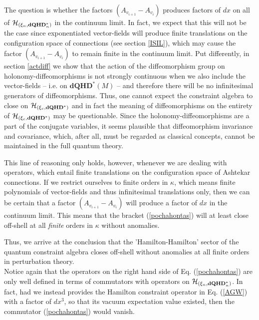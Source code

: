 \documentclass[12pt]{article}
\def\ch{{\cal H}}
\begin{document}
The question is whether the factors $(A_{v_{i+1}}-A_{v_i})$ produces factors of $dx$ on all of $\ch_{(\xi_n,\mathbf{dQHD}^*_n)}$ in the continuum limit. In fact, we expect that this will not be the case since exponentiated vector-fields will produce finite translations on the configuration space of connections (see section \ref{ISIL}), which may cause the factor $(A_{v_{i+1}}-A_{v_i})$ to remain finite in the continuum limit. Put differently, in section \ref{actdiff} we show that the action of the diffeomorphism group on holonomy-diffeomorphisms is not strongly continuous when we also include the vector-fields -- i.e. on $\mathbf{dQHD}^*(M)$ -- and therefore there will be no infinitesimal generators of diffeomorphisms. Thus, one cannot expect the constraint algebra to close on $\ch_{(\xi_c,\mathbf{dQHD}^*)}$  and in fact the meaning of diffeomorphisms on the entirety of $\ch_{(\xi_c,\mathbf{dQHD}^*)}$ may be questionable. Since the holonomy-diffeomorphisms are a part of the conjugate variables, it seems plausible that diffeomorphism invariance and covariance, which, after all, must be regarded as classical concepts, cannot be maintained in the full quantum theory.

This line of reasoning only holds, however, whenever we are dealing with operators, which entail finite translations on the configuration space of Ashtekar connections. If we restrict ourselves to finite orders in $\kappa$, which means finite polynomials of vector-fields and thus infinitesimal translations only, then we can be certain that a factor $(A_{v_{i+1}}-A_{v_i})$ will produce a factor of $dx$ in the continuum limit. This means that the bracket (\ref{pochahontas}) will at least close off-shell at all {\it finite} orders in $\kappa$ without anomalies.

Thus, we arrive at the conclusion that the 'Hamilton-Hamilton' sector of the quantum constraint algebra closes off-shell without anomalies at all finite orders in perturbation theory. \\


Notice again that the operators on the right hand side of  Eq. (\ref{pochahontas}) are only well defined in terms of commutators with operators on $\ch_{(\xi_n,\mathbf{dQHD}^*_n)}$. In fact, had we instead provides the Hamilton constraint operator in Eq. (\ref{AGW}) with a factor of $dx^3$, so that its vacuum expectation value existed, then the commutator (\ref{pochahontas}) would vanish.\\
\end{document}
